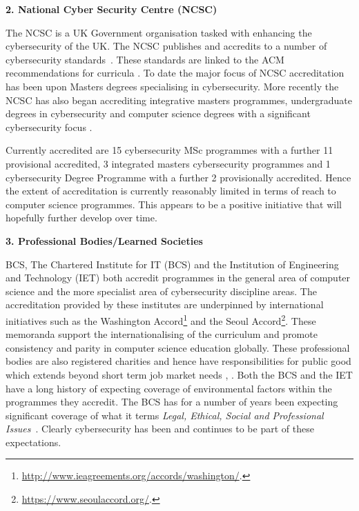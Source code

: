 \documentclass[conference]{IEEEtran}
\begin{document}
\textbf{2. National Cyber Security Centre (NCSC)}

The NCSC is a UK Government organisation tasked with enhancing the cybersecurity of the UK. The NCSC publishes and accredits to a number of cybersecurity standards~\cite{NCSC2017}. These standards are linked to the ACM recommendations for curricula \cite{ACM2013a}. To date the major focus of NCSC accreditation has been upon Masters degrees specialising in cybersecurity. More recently the NCSC has also began accrediting integrative masters programmes, undergraduate degrees in cybersecurity and computer science degrees with a significant cybersecurity focus \cite{NCSC2018b}.

Currently accredited are 15 cybersecurity MSc programmes with a further 11 provisional accredited, 3 integrated masters cybersecurity programmes and 1 cybersecurity Degree Programme with a further 2 provisionally accredited. Hence the extent of accreditation is currently reasonably limited in terms of reach to computer science programmes. This appears to be a positive initiative that will hopefully further develop over time. 

\textbf{3. Professional Bodies/Learned Societies}

BCS, The Chartered Institute for IT (BCS) and the Institution of Engineering and Technology (IET) both accredit programmes in the general area of computer science and the more specialist area of cybersecurity discipline areas. The accreditation provided by these institutes are underpinned by international initiatives such as the Washington Accord\footnote{\url{http://www.ieagreements.org/accords/washington/}.} and the Seoul Accord\footnote{\url{https://www.seoulaccord.org/}.}. These memoranda support the internationalising of the curriculum and promote consistency and parity in computer science education globally.   These professional bodies are also registered charities and hence have responsibilities for public good which extends beyond short term job market needs \cite{Stensaker2006}, \cite{Mutereko2017}. Both the BCS and the IET have a long history of expecting coverage of environmental factors within the programmes they accredit. The BCS has for a number of years been expecting significant coverage of what it terms  {\emph{Legal, Ethical, Social and Professional Issues}}~\cite{Brooke2018}. Clearly cybersecurity has been and continues to be part of these expectations. 
\end{document}
